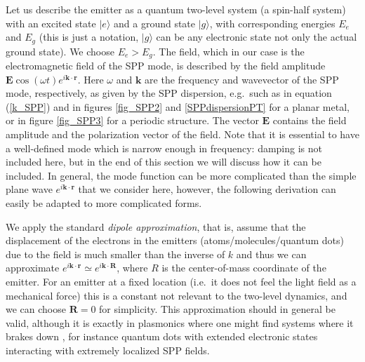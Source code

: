 \documentclass[12pt]{iopart}
\begin{document}
Let us describe the emitter as a quantum two-level system (a spin-half system) with an excited state $|e\rangle$ and a ground state $|g\rangle$, with corresponding energies $E_e$ and $E_g$ (this is just a notation, $|g\rangle$ can be any electronic state not only the actual ground state). We choose $E_e>E_g$. The field, which in our case is the electromagnetic field of the SPP mode, is described by the field amplitude $\mathbf{E} \cos (\omega t)e^{i \mathbf{k} \cdot \mathbf{r}}$. Here $\omega$ and $\mathbf{k}$ are the frequency and wavevector of the SPP mode, respectively, as given by the SPP dispersion, e.g.\ such as in equation (\ref{k_SPP}) and in figures \ref{fig_SPP2} and \ref{SPPdispersionPT} for a planar metal, or in figure \ref{fig_SPP3} for a periodic structure. The vector $\mathbf{E}$ contains the field amplitude and the polarization vector of the field. Note that it is essential to have a well-defined mode which is narrow enough in frequency: damping is not included here, but in the end of this section we will discuss how it can be included. In general, the mode function can be more complicated than the simple plane wave $e^{i \mathbf{k} \cdot \mathbf{r}}$ that we consider here, however, the following derivation can easily be adapted to more complicated forms.   

We apply the standard {\it dipole approximation}, that is, assume that the displacement of the electrons in the emitters (atoms/molecules/quantum dots) due to the field is much smaller than the inverse of $k$ and thus we can approximate $e^{i \mathbf{k} \cdot \mathbf{r}}\simeq e^{i \mathbf{k} \cdot \mathbf{R}}$, where $R$ is the center-of-mass coordinate of the emitter. For an emitter
at a fixed location (i.e.\ it does not feel the light field as a mechanical force) this is a constant not relevant to the two-level dynamics, and we can choose $\mathbf{R}=0$ for simplicity. 
This approximation should in general be valid, although it is exactly in plasmonics where one might find systems where it brakes down \cite{Andersen2011}, for instance quantum dots with extended electronic states interacting with extremely localized SPP fields.
\end{document}
